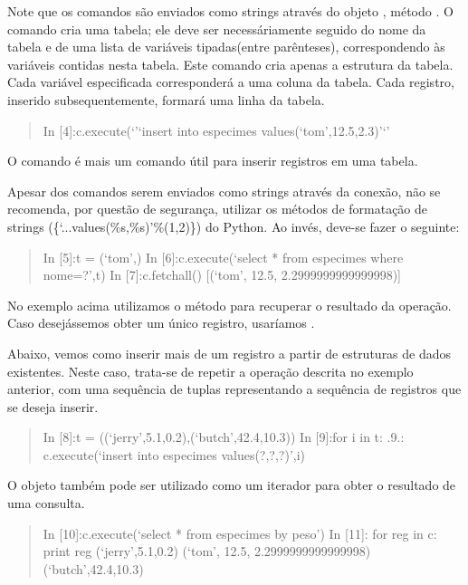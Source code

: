 \documentclass[a4paper,10pt,portuguese]{sphinxmanual}
\begin{document}
Note que os comandos  são enviados como strings através do
objeto , método . O comando
 cria uma tabela; ele deve ser necessáriamente
seguido do nome da tabela e de uma lista de variáveis tipadas(entre
parênteses), correspondendo às variáveis contidas nesta tabela.
Este comando cria apenas a estrutura da tabela. Cada variável
especificada corresponderá a uma coluna da tabela. Cada registro,
inserido subsequentemente, formará uma linha da tabela.
\begin{quote}

In {[}4{]}:c.execute(`'`insert into especimes
values(`tom',12.5,2.3)'`'
\end{quote}

O comando  é mais um comando  útil para inserir
registros em uma tabela.

Apesar dos comandos  serem enviados como strings através da
conexão, não se recomenda, por questão de segurança, utilizar os
métodos de formatação de strings (\{`...values(\%s,\%s)'\%(1,2)\}) do
Python. Ao invés, deve-se fazer o seguinte:
\begin{quote}

In {[}5{]}:t = (`tom',) In {[}6{]}:c.execute(`select * from especimes
where nome=?',t) In {[}7{]}:c.fetchall() {[}(`tom', 12.5,
2.2999999999999998){]}
\end{quote}

No exemplo acima utilizamos o método  para recuperar o
resultado da operação. Caso desejássemos obter um único registro,
usaríamos .

Abaixo, vemos como inserir mais de um registro a partir de
estruturas de dados existentes. Neste caso, trata-se de repetir a
operação descrita no exemplo anterior, com uma sequência de tuplas
representando a sequência de registros que se deseja inserir.
\begin{quote}

In {[}8{]}:t = ((`jerry',5.1,0.2),(`butch',42.4,10.3)) In {[}9{]}:for i in
t: .9.: c.execute(`insert into especimes values(?,?,?)',i)
\end{quote}

O objeto  também pode ser utilizado como um iterador para
obter o resultado de uma consulta.
\begin{quote}

In {[}10{]}:c.execute(`select * from especimes by peso') In {[}11{]}: for
reg in c: print reg (`jerry',5.1,0.2) (`tom', 12.5,
2.2999999999999998) (`butch',42.4,10.3)
\end{quote}
\end{document}
